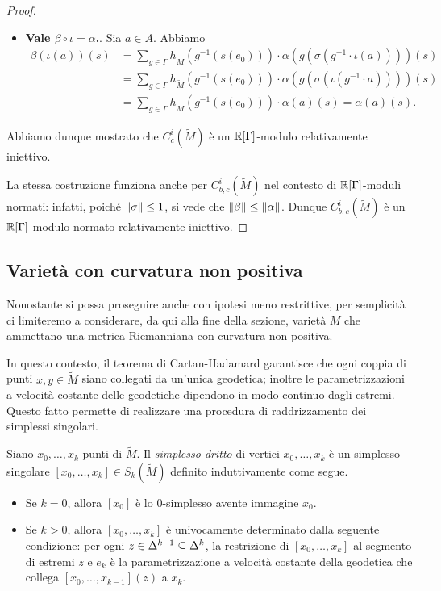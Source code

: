\begin{proof}
\begin{itemize}
\item \textbf{Vale $\beta\circ\iota=\alpha$.}. Sia $a\in A$. Abbiamo
\begin{align*}
\beta(\iota(a))(s)&=\sum_{g\in\Gamma}h_{\widetilde M}(g^{-1}(s(e_0)))\cdot \alpha(g(\sigma(g^{-1}\cdot\iota(a))))(s)\\
&=\sum_{g\in\Gamma}h_{\widetilde M}(g^{-1}(s(e_0)))\cdot \alpha(g(\sigma(\iota(g^{-1}\cdot a))))(s)\\
&=\sum_{g\in\Gamma}h_{\widetilde M}(g^{-1}(s(e_0)))\cdot \alpha(a)(s)=\alpha(a)(s).
\end{align*}
\end{itemize}
Abbiamo dunque mostrato che $C^i_c(\widetilde M)$ è un $\mathbb{R}[\Gamma]$-modulo relativamente iniettivo.

La stessa costruzione funziona anche per $C^i_{b,c}(\widetilde M)$ nel contesto di $\mathbb{R}[\Gamma]$-moduli normati: infatti, poiché $\left\lVert \sigma\right\rVert\le 1$, si vede che $\left\lVert \beta\right\rVert\le\left\lVert \alpha\right\rVert$. Dunque $C^i_{b,c}(\widetilde M)$ è un $\mathbb{R}[\Gamma]$-modulo normato relativamente iniettivo.
\end{proof}

\subsection{Varietà con curvatura non positiva}
Nonostante si possa proseguire anche con ipotesi meno restrittive, per semplicità ci limiteremo a considerare, da qui alla fine della sezione, varietà $M$ che ammettano una metrica Riemanniana con curvatura non positiva.

In questo contesto, il teorema di Cartan-Hadamard garantisce che ogni coppia di punti $x,y\in\widetilde M$ siano collegati da un'unica geodetica; inoltre le parametrizzazioni a velocità costante delle geodetiche dipendono in modo continuo dagli estremi. Questo fatto permette di realizzare una procedura di raddrizzamento dei simplessi singolari.

\begin{definition}
Siano $x_0,\ldots,x_k$ punti di $\widetilde M$. Il \emph{simplesso dritto} di vertici $x_0,\ldots,x_k$ è un simplesso singolare $[x_0,\ldots,x_k]\in S_k(\widetilde M)$ definito induttivamente come segue.
\begin{itemize}
\item Se $k=0$, allora $[x_0]$ è lo $0$-simplesso avente immagine $x_0$.
\item Se $k>0$, allora $[x_0,\ldots,x_k]$ è univocamente determinato dalla seguente condizione: per ogni $z\in\Delta^{k-1}\subseteq\Delta^k$, la restrizione di $[x_0,\ldots,x_k]$ al segmento di estremi $z$ e $e_k$ è la parametrizzazione a velocità costante della geodetica che collega $[x_0,\ldots,x_{k-1}](z)$ a $x_k$.
\end{itemize}
\end{definition}

